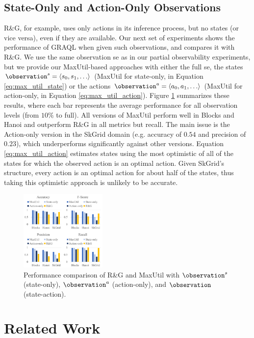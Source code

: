 \documentclass[letterpaper]{article}
\begin{document}
\subsection{State-Only and Action-Only Observations}

R\&G, for example, uses only actions in its inference process, but no states (or vice versa), even if they are available.
Our next set of experiments shows the performance of GRAQL when given such observations, and compares it with R\&G.
We use the same observation se as in our partial observability experiments, but we provide our MaxUtil-based approaches with either the full se, the states $\observation^s = \langle s_0, s_1, \ldots \rangle$ (MaxUtil for state-only, in Equation \ref{eq:max_util_state}) or the actions $\observation^a = \langle a_0, a_1, \ldots \rangle$ (MaxUtil for action-only, in Equation \ref{eq:max_util_action}).
%
Figure \ref{fig:simpler_obs} summarizes these results, where each bar represents the average performance for all observation levels (from $10\%$ to full).
All versions of MaxUtil perform well in Blocks and Hanoi and outperform R\&G in all metrics but recall.
The main issue is the Action-only version in the SkGrid domain (e.g. accuracy of $0.54$ and precision of $0.23$), which underperforms significantly against other versions.
Equation \ref{eq:max_util_action} estimates states using the most optimistic of all of the states for which the observed action is an optimal action.
Given SkGrid's structure, every action is an optimal action for about half of the states, thus taking this optimistic approach is unlikely to be accurate.

\begin{figure}[!b]
    \centering
    \includegraphics[width=0.38\textwidth]{Figures/simpler_observations.pdf}
    \caption{Performance comparison of R\&G and MaxUtil with $\observation^s$ (state-only), $\observation^a$ (action-only), and $\observation$ (state-action).}
    \label{fig:simpler_obs}
\end{figure}

\section*{Related Work}
\label{sec:related_work}
\end{document}
